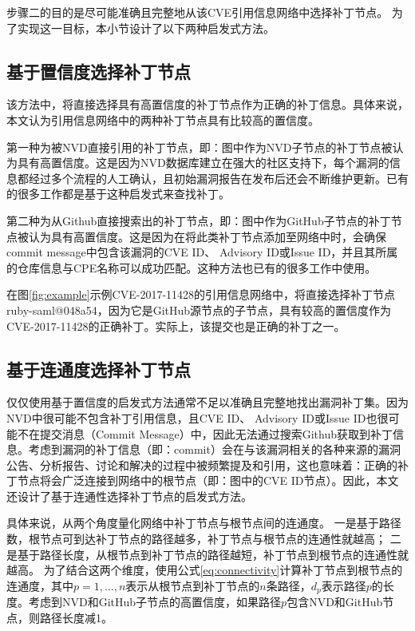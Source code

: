 步骤二的目的是尽可能准确且完整地从该CVE引用信息网络中选择补丁节点。 为了实现这一目标，本小节设计了以下两种启发式方法。

\subsection{基于置信度选择补丁节点}
该方法中，\tool 将直接选择具有高置信度的补丁节点作为正确的补丁信息。具体来说，本文认为引用信息网络中的两种补丁节点具有比较高的置信度。

第一种为被NVD直接引用的补丁节点，即：图中作为NVD子节点的补丁节点被认为具有高置信度。这是因为NVD数据库建立在强大的社区支持下，每个漏洞的信息都经过多个流程的人工确认，且初始漏洞报告在发布后还会不断维护更新。已有的很多工作\cite{duan2019automating, li2016vulpecker, li2018vuldeepecker}都是基于这种启发式来查找补丁。

第二种为从Github直接搜索出的补丁节点，即：图中作为GitHub子节点的补丁节点被认为具有高置信度。这是因为在将此类补丁节点添加至网络中时，\tool 会确保commit message中包含该漏洞的CVE ID、 Advisory ID或Issue ID，并且其所属的仓库信息与CPE名称可以成功匹配。这种方法也已有的很多工作\cite{you2017semfuzz, Wang2020empirical}中使用。

\begin{exmp}
在图\ref{fig:example}示例CVE-2017-11428的引用信息网络中，\tool 将直接选择补丁节点ruby-saml@048a54，因为它是GitHub源节点的子节点，具有较高的置信度作为CVE-2017-11428的正确补丁。实际上，该提交也是正确的补丁之一。
\end{exmp}

\subsection{基于连通度选择补丁节点}
仅仅使用基于置信度的启发式方法通常不足以准确且完整地找出漏洞补丁集。因为NVD中很可能不包含补丁引用信息，且CVE ID、 Advisory ID或Issue ID也很可能不在提交消息（Commit Message）中，因此无法通过搜索Github获取到补丁信息。考虑到漏洞的补丁信息（即：commit）会在与该漏洞相关的各种来源的漏洞公告、分析报告、讨论和解决的过程中被频繁提及和引用，这也意味着：正确的补丁节点将会广泛连接到网络中的根节点（即：图中的CVE ID节点）。因此，本文还设计了基于连通性选择补丁节点的启发式方法。

具体来说，\tool 从两个角度量化网络中补丁节点与根节点间的连通度。 一是基于路径数，根节点可到达补丁节点的路径越多，补丁节点与根节点的连通性就越高； 二是基于路径长度，从根节点到补丁节点的路径越短，补丁节点到根节点的连通性就越高。 为了结合这两个维度，\tool 使用公式\ref{eq:connectivity}计算补丁节点到根节点的连通度，其中$ p = 1, ..., n$表示从根节点到补丁节点的$n$条路径，$d_p$表示路径$p$的长度。考虑到NVD和GitHub子节点的高置信度，如果路径$p$包含NVD和GitHub节点，则路径长度减1。

